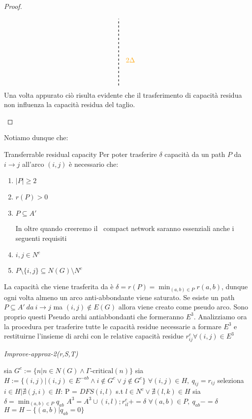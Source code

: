 \begin{proof}
\begin{enumerate}
\[\begin{tikzpicture}[node distance={15mm}, thick , main/.style = {draw, circle}]
                        \draw[dashed] (1.8,-1.7) -- (1.8,1.7);
                        \node at (2.4, -.4) {\text{\color{darktangerine}{$2\Delta$}}};
                    \end{tikzpicture}\]
                Una volta appurato ciò risulta evidente che il trasferimento di capacità residua non influenza la capacità residua del taglio. \QED
            \end{enumerate}
        \end{proof}
    Notiamo dunque che:
    \begin{definition}
        {Transferrable residual capacity}{}
        Per poter trasferire $\delta$ capacità da un path $P$ da $i\rightarrow j$ all'arco $(i,j)$ è necessario che:
        \begin{enumerate}
            \item $|P|\ge 2$
            \item $r(P) > 0$
            \item $P\subseteq A'$
       
        In oltre quando creeremo il \gmm\ compact network saranno essenziali anche i seguenti requisiti
        \item $i,j \in N^c$
        \item $P\setminus \{i,j\} \subseteq N(G) \setminus N^c$
    \end{enumerate}
    \end{definition} 
    La capacità che viene trasferita da è $\delta = r(P) = \min_{(a,b)\in P} r(a,b)$, dunque ogni volta almeno un arco anti-abbondante viene saturato. 
    Se esiste un path $P\subseteq A'\ da\ i\rightarrow j $ ma $(i,j)\not \in E(G)$ allora viene creato come pseudo arco. 
    Sono proprio questi Pseudo archi antiabbondanti che formeranno $E^3$. 
    Analizziamo ora la procedura per trasferire tutte le capacità residue necessarie a formare $E^3$ e restituirne l'insieme di archi
    con le relative capacità residue $r^c_{ij} \forall (i,j)\in E^3$

\begin{algorithm}
    \caption{\textit{Improve-approx-2(r,S,T)}}
    \label{imrAprx}
    \begin{algorithmic}[1]
        \State sia $G^c := \{n | n\in N(G)\land \Gamma\text{-critical}(n)\}$
        \State sia $H := \{(i,j)| (i,j)\in E^{-ab}\land i \not \in G^c \lor j \not \in G^c\}$
        \State $\forall (i,j)\in H,\ q_{ij} = r_{ij}$
            \State seleziona $i \in H | \nexists (j,i) \in H$:
            \State P = $DFS(i, l)$ s.t $l\in N^c \lor \nexists (l,k)\in H$ 
            \State sia $\delta = \min_{(a,b)\in P}q_{ab}$
                \State $A^3 = A^3 \cup {(i,l)}; r^c_{il} += \delta$
            \EndIf
            \State $\forall (a,b) \in P,\ q_{ab} -= \delta$
            \State $H = H- \{(a,b) | q_{ab} = 0\}$ 
        \EndWhile 
    \end{algorithmic}
\end{algorithm}

